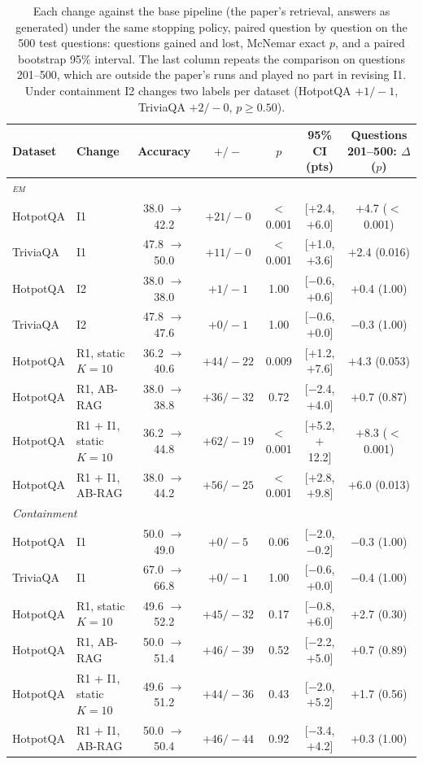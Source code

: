 \documentclass[11pt]{article}
\newcommand{\EM}{\textsc{em}}
\begin{document}
\begin{table}[t]
\centering
\footnotesize
\setlength{\tabcolsep}{4.5pt}
\begin{tabular}{llccccc}
\toprule
Dataset & Change & Accuracy & $+/-$ & $p$ & 95\% CI (pts) & Questions 201--500: $\Delta$ ($p$) \\
\midrule
\multicolumn{7}{l}{\emph{\EM{}}} \\
HotpotQA & I1 & 38.0 $\to$ 42.2 & $+21/-0$ & $<$0.001 & [$+$2.4, $+$6.0] & $+$4.7 ($<$0.001) \\
TriviaQA & I1 & 47.8 $\to$ 50.0 & $+11/-0$ & $<$0.001 & [$+$1.0, $+$3.6] & $+$2.4 (0.016) \\
HotpotQA & I2 & 38.0 $\to$ 38.0 & $+1/-1$ & 1.00 & [$-$0.6, $+$0.6] & $+$0.4 (1.00) \\
TriviaQA & I2 & 47.8 $\to$ 47.6 & $+0/-1$ & 1.00 & [$-$0.6, $+$0.0] & $-$0.3 (1.00) \\
HotpotQA & R1, static $K{=}10$ & 36.2 $\to$ 40.6 & $+44/-22$ & 0.009 & [$+$1.2, $+$7.6] & $+$4.3 (0.053) \\
HotpotQA & R1, AB-RAG & 38.0 $\to$ 38.8 & $+36/-32$ & 0.72 & [$-$2.4, $+$4.0] & $+$0.7 (0.87) \\
HotpotQA & R1 + I1, static $K{=}10$ & 36.2 $\to$ 44.8 & $+62/-19$ & $<$0.001 & [$+$5.2, $+$12.2] & $+$8.3 ($<$0.001) \\
HotpotQA & R1 + I1, AB-RAG & 38.0 $\to$ 44.2 & $+56/-25$ & $<$0.001 & [$+$2.8, $+$9.8] & $+$6.0 (0.013) \\
\midrule
\multicolumn{7}{l}{\emph{Containment}} \\
HotpotQA & I1 & 50.0 $\to$ 49.0 & $+0/-5$ & 0.06 & [$-$2.0, $-$0.2] & $-$0.3 (1.00) \\
TriviaQA & I1 & 67.0 $\to$ 66.8 & $+0/-1$ & 1.00 & [$-$0.6, $+$0.0] & $-$0.4 (1.00) \\
HotpotQA & R1, static $K{=}10$ & 49.6 $\to$ 52.2 & $+45/-32$ & 0.17 & [$-$0.8, $+$6.0] & $+$2.7 (0.30) \\
HotpotQA & R1, AB-RAG & 50.0 $\to$ 51.4 & $+46/-39$ & 0.52 & [$-$2.2, $+$5.0] & $+$0.7 (0.89) \\
HotpotQA & R1 + I1, static $K{=}10$ & 49.6 $\to$ 51.2 & $+44/-36$ & 0.43 & [$-$2.0, $+$5.2] & $+$1.7 (0.56) \\
HotpotQA & R1 + I1, AB-RAG & 50.0 $\to$ 50.4 & $+46/-44$ & 0.92 & [$-$3.4, $+$4.2] & $+$0.3 (1.00) \\
\bottomrule
\end{tabular}
\caption{Each change against the base pipeline (the paper's retrieval, answers as generated) under the same stopping policy, paired question by question on the 500 test questions: questions gained and lost, McNemar exact $p$, and a paired bootstrap 95\% interval. The last column repeats the comparison on questions 201--500, which are outside the paper's runs and played no part in revising I1. Under containment I2 changes two labels per dataset (HotpotQA $+1/-1$, TriviaQA $+2/-0$, $p \ge 0.50$).}
\label{tab:ftpaired}
\end{table}
\end{document}
